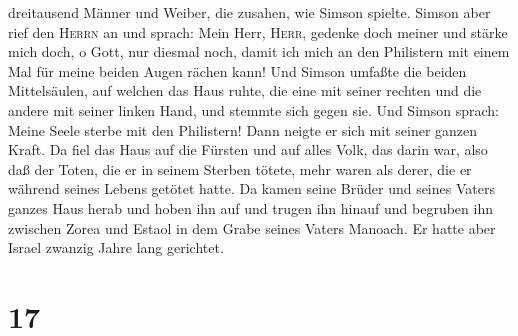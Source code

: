 dreitausend Männer und Weiber, die zusahen, wie Simson spielte.
 Simson aber rief den \textsc{Herrn} an und sprach: Mein
Herr, \textsc{Herr}, gedenke doch meiner und stärke mich doch, o Gott,
nur diesmal noch, damit ich mich an den Philistern mit einem Mal für
meine beiden Augen rächen kann!  Und Simson umfaßte die
beiden Mittelsäulen, auf welchen das Haus ruhte, die eine mit seiner
rechten und die andere mit seiner linken Hand, und stemmte sich gegen
sie.  Und Simson sprach: Meine Seele sterbe mit den
Philistern! Dann neigte er sich mit seiner ganzen Kraft. Da fiel das
Haus auf die Fürsten und auf alles Volk, das darin war, also daß der
Toten, die er in seinem Sterben tötete, mehr waren als derer, die er
während seines Lebens getötet hatte.  Da kamen seine
Brüder und seines Vaters ganzes Haus herab und hoben ihn auf und trugen
ihn hinauf und begruben ihn zwischen Zorea und Estaol in dem Grabe
seines Vaters Manoach. Er hatte aber Israel zwanzig Jahre lang
gerichtet.

\hypertarget{section-16}{%
\section{17}\label{section-16}}


